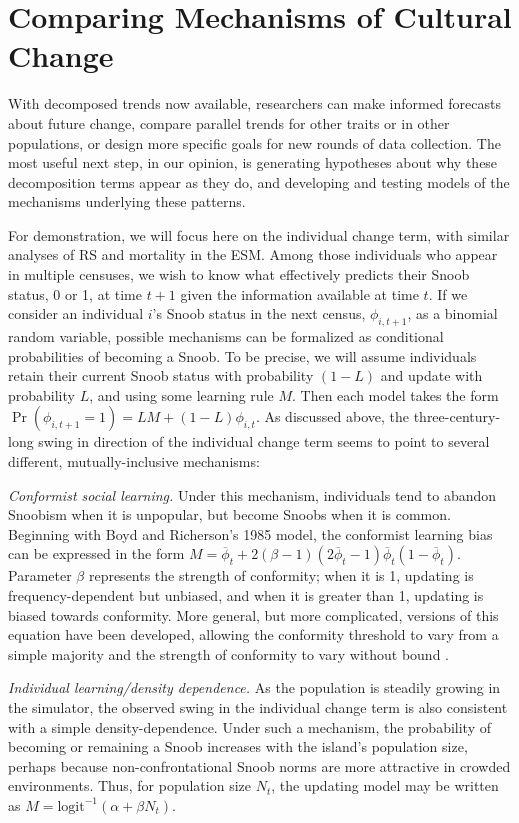 \documentclass[11pt]{article}
\begin{document}
\section{Comparing Mechanisms of Cultural Change}

With decomposed trends now available, researchers can make informed forecasts about future change, compare parallel trends for other traits or in other populations, or design more specific goals for new rounds of data collection.  The most useful next step, in our opinion, is generating hypotheses about why these decomposition terms appear as they do, and developing and testing models of the mechanisms underlying these patterns.

For demonstration, we will focus here on the individual change term, with similar analyses of RS and mortality in the ESM.  Among those individuals who appear in multiple censuses, we wish to know what effectively predicts their Snoob status, 0 or 1, at time $t+1$ given the information available at time $t$.  If we consider an individual $i$'s Snoob status in the next census, $\phi_{i,t+1}$, as a binomial random variable, possible mechanisms can be formalized as  conditional probabilities of becoming a Snoob.  To be precise, we will assume individuals retain their current Snoob status with probability $(1-L)$ and update with probability $L$, and using some learning rule $M$.  Then each model takes the form $\Pr(\phi_{i,t+1}=1) = LM + (1-L)\phi_{i,t}$.  As discussed above, the three-century-long swing in direction of the individual change term seems to point to several different, mutually-inclusive mechanisms: 

\textit{Conformist social learning.}  Under this mechanism, individuals tend to abandon Snoobism when it is unpopular, but become Snoobs when it is common.  Beginning with Boyd and Richerson's 1985 model, the conformist learning bias can be expressed in the form $M = \overline{\phi}_t + 2(\beta-1)(2\overline{\phi}_t - 1)\overline{\phi}_t(1-\overline{\phi}_t)$. Parameter $\beta$ represents the strength of conformity; when it is 1, updating is frequency-dependent but unbiased, and when it is greater than 1, updating is biased towards conformity.  More general, but more complicated, versions of this equation have been developed, allowing the conformity threshold to vary from a simple majority \citep{bowles2006microeconomics} and the strength of conformity to vary without bound \citep{mcelreath2008beyond}. 
 
\textit{Individual learning/density dependence.}  As the population is steadily growing in the simulator, the observed swing in the individual change term is also consistent with a simple density-dependence.  Under such a mechanism, the probability of becoming or remaining a Snoob increases with the island's population size, perhaps because non-confrontational Snoob norms are more attractive in crowded environments.  Thus, for population size $N_t$, the updating model may be written as $M=\mathrm{logit}^{-1}(\alpha + \beta N_t)$.  
\end{document}
